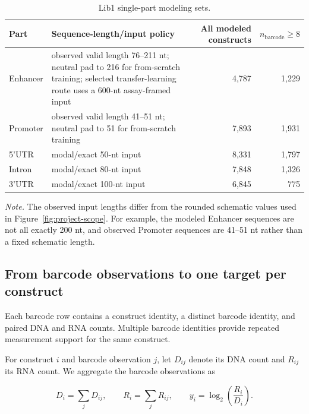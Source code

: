 \documentclass[11pt]{article}
\begin{document}
\begin{table}[H]
\centering
\caption{Lib1 single-part modeling sets.}
\label{tab:lib1sets}
\begin{tabularx}{\linewidth}{lXrr}
\toprule
Part & Sequence-length/input policy & All modeled constructs & $n_{\mathrm{barcode}}\geq8$ \\
\midrule
Enhancer & observed valid length 76--211 nt; neutral pad to 216 for
from-scratch training; selected transfer-learning route uses a 600-nt
assay-framed input & 4,787 & 1,229 \\
Promoter & observed valid length 41--51 nt; neutral pad to 51 for
from-scratch training & 7,893 & 1,931 \\
5'UTR & modal/exact 50-nt input & 8,331 & 1,797 \\
Intron & modal/exact 80-nt input & 7,848 & 1,326 \\
3'UTR & modal/exact 100-nt input & 6,845 & 775 \\
\bottomrule
\end{tabularx}
\vspace{0.4em}

\begin{minipage}{0.98\linewidth}
\footnotesize\textit{Note.} The observed input lengths differ from the rounded
schematic values used in Figure~\ref{fig:project-scope}. For example, the
modeled Enhancer sequences are not all exactly 200 nt, and observed Promoter
sequences are 41--51 nt rather than a fixed schematic length.
\end{minipage}
\end{table}

\subsection{From barcode observations to one target per construct}

Each barcode row contains a construct identity, a distinct barcode identity,
and paired DNA and RNA counts. Multiple barcode identities provide repeated
measurement support for the same construct.

For construct $i$ and barcode observation $j$, let $D_{ij}$ denote its DNA
count and $R_{ij}$ its RNA count. We aggregate the barcode observations as

\begin{equation}
D_i=\sum_j D_{ij}, \qquad
R_i=\sum_j R_{ij}, \qquad
y_i=\log_2\left(\frac{R_i}{D_i}\right).
\label{eq:target}
\end{equation}
\end{document}
